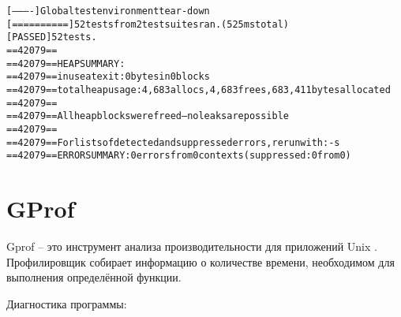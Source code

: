 \begin{alltt}
[----------] Global test environment tear-down
[==========] 52 tests from 2 test suites ran. (525 ms total)
[  PASSED  ] 52 tests.
==42079== 
==42079== HEAP SUMMARY:
==42079==     in use at exit: 0 bytes in 0 blocks
==42079==   total heap usage: 4,683 allocs, 4,683 frees, 683,411 bytes allocated
==42079== 
==42079== All heap blocks were freed -- no leaks are possible
==42079== 
==42079== For lists of detected and suppressed errors, rerun with: -s
==42079== ERROR SUMMARY: 0 errors from 0 contexts (suppressed: 0 from 0)
\end{alltt}

\pagebreak

\section{GProf}

Gprof -- это инструмент анализа производительности для приложений Unix \cite{Gprof}.
Профилировщик собирает информацию о количестве времени, необходимом для выполнения
определённой функции.

Диагностика программы:

